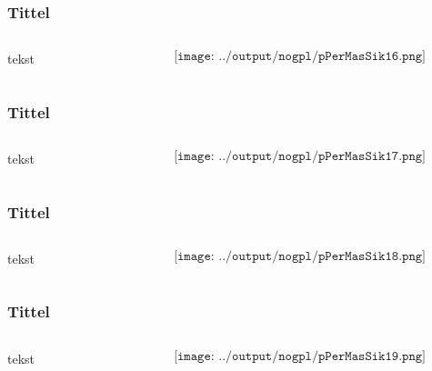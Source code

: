 \documentclass[aspectratio=169,xcolor=dvipsnames]{beamer}
\begin{document}
\begin{frame}
	\frametitle{Tittel}
	\begin{columns}
		\begin{column}{0.5\textwidth}
tekst
			
		\end{column}

		\begin{column}{0.5\textwidth}
	$$\texttt{[image: ../output/nogpl/pPerMasSik16.png]}$$
		\end{column}
	\end{columns}
\end{frame}

\begin{frame}
	\frametitle{Tittel}
	\begin{columns}
		\begin{column}{0.5\textwidth}
tekst
			
		\end{column}

		\begin{column}{0.5\textwidth}
	$$\texttt{[image: ../output/nogpl/pPerMasSik17.png]}$$
		\end{column}
	\end{columns}
\end{frame}

\begin{frame}
	\frametitle{Tittel}
	\begin{columns}
		\begin{column}{0.5\textwidth}
tekst
			
		\end{column}

		\begin{column}{0.5\textwidth}
	$$\texttt{[image: ../output/nogpl/pPerMasSik18.png]}$$
		\end{column}
	\end{columns}
\end{frame}

\begin{frame}
	\frametitle{Tittel}
	\begin{columns}
		\begin{column}{0.5\textwidth}
tekst
			
		\end{column}

		\begin{column}{0.5\textwidth}
	$$\texttt{[image: ../output/nogpl/pPerMasSik19.png]}$$
		\end{column}
	\end{columns}
\end{frame}
\end{document}
